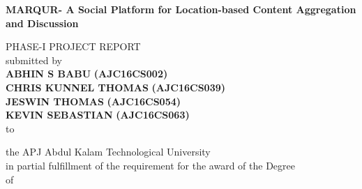 \begin{titlepage}
\newpage
\begin{center}
{\Large\textbf{MARQUR- A Social Platform for Location-based Content Aggregation and Discussion }}\\
\end{center}
\vspace{0.2cm}
\begin{center} 
\normalsize{PHASE-I PROJECT REPORT} \\
\vspace{0.2cm}
submitted by\\
\vspace{0.5cm}
{\large\textbf{ABHIN S BABU}}
\textbf{(AJC16CS002)}\\
{\large\textbf{CHRIS KUNNEL THOMAS}}
\textbf{(AJC16CS039)}\\
{\large\textbf{JESWIN THOMAS}}
\textbf{(AJC16CS054)}\\
{\large\textbf{KEVIN SEBASTIAN}}
\textbf{(AJC16CS063)}\\
\vspace{0.2cm}
to
\vspace{0.2cm}
\end{center} 
\begin{center}
the APJ Abdul Kalam Technological University\\
in partial fulfillment of the requirement for the award of the Degree
\\
\vspace{0.5cm}
of\\
\vspace{0.5cm}


\end{center}
\end{titlepage}
